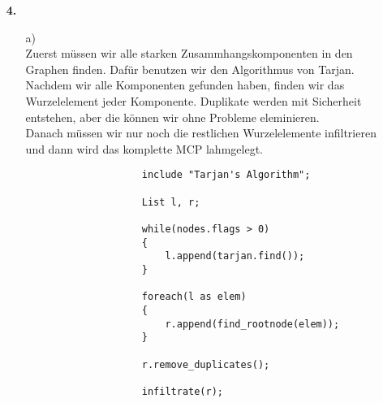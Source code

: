 \documentclass[a4paper,11pt,ngerman]{scrartcl}
\begin{document}
\begin{enumerate}
\begin{enumerate}
\begin{multicols}{2}
				\end{multicols}
		\end{enumerate}
		\item[\textbf{4.}]
		\begin{enumerate}
			\item[a)]\quad \\
				Zuerst müssen wir alle starken Zusammhangskomponenten in den Graphen finden. Dafür benutzen wir den Algorithmus von Tarjan. Nachdem wir alle Komponenten gefunden haben, finden wir das Wurzelelement jeder Komponente. Duplikate werden mit Sicherheit entstehen, aber die können wir ohne Probleme eleminieren.\\
				Danach müssen wir nur noch die restlichen Wurzelelemente infiltrieren und dann wird das komplette MCP lahmgelegt.

				\begin{verbatim}
					include "Tarjan's Algorithm";

					List l, r;

					while(nodes.flags > 0)
					{
					    l.append(tarjan.find());
					}

					foreach(l as elem)
					{
					    r.append(find_rootnode(elem));
					}

					r.remove_duplicates();

					infiltrate(r);
				\end{verbatim}


\end{enumerate}
\end{enumerate}
\end{document}
